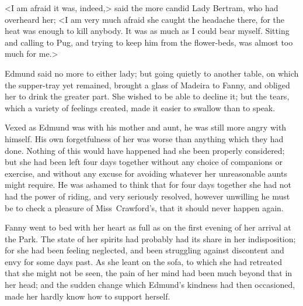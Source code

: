 <I am afraid it was, indeed,> said the more candid Lady Bertram, who had overheard her; <I am very much afraid she caught the headache there, for the heat was enough to kill anybody. It was as much as I could bear myself. Sitting and calling to Pug, and trying to keep him from the flower-beds, was almost too much for me.>

Edmund said no more to either lady; but going quietly to another table, on which the supper-tray yet remained, brought a glass of Madeira to Fanny, and obliged her to drink the greater part. She wished to be able to decline it; but the tears, which a variety of feelings created, made it easier to swallow than to speak.

Vexed as Edmund was with his mother and aunt, he was still more angry with himself. His own forgetfulness of her was worse than anything which they had done. Nothing of this would have happened had she been properly considered; but she had been left four days together without any choice of companions or exercise, and without any excuse for avoiding whatever her unreasonable aunts might require. He was ashamed to think that for four days together she had not had the power of riding, and very seriously resolved, however unwilling he must be to check a pleasure of Miss~Crawford's, that it should never happen again.

Fanny went to bed with her heart as full as on the first evening of her arrival at the Park. The state of her spirits had probably had its share in her indisposition; for she had been feeling neglected, and been struggling against discontent and envy for some days past. As she leant on the sofa, to which she had retreated that she might not be seen, the pain of her mind had been much beyond that in her head; and the sudden change which Edmund's kindness had then occasioned, made her hardly know how to support herself. 
